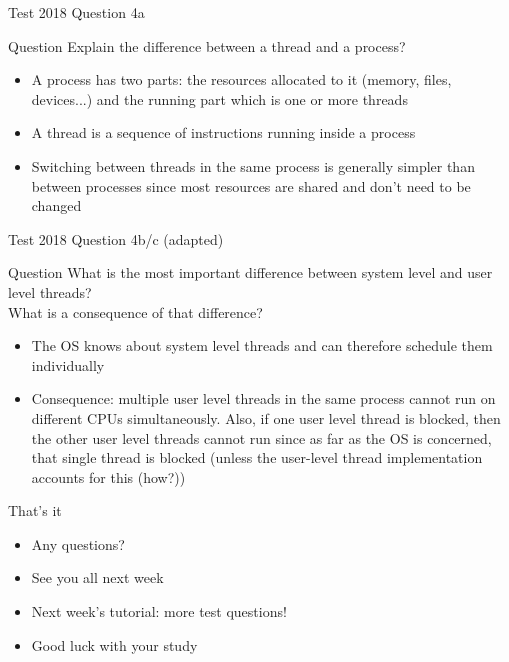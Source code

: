 \documentclass[notes]{beamer}
\begin{document}
\begin{frame}{Test 2018 Question 4a}
    \begin{alertblock}{Question}
        Explain the difference between a thread and a process?
    \end{alertblock}
    \pause
    \begin{itemize}
        \item A process has two parts: the resources allocated to it (memory, files, devices...) and the running part which is one or more threads
        \item A thread is a sequence of instructions running inside a process
        \item Switching between threads in the same process is generally simpler than between processes since most resources are shared and don't need to be changed
    \end{itemize}
\end{frame}
\begin{frame}{Test 2018 Question 4b/c (adapted)}
    \begin{alertblock}{Question}
        What is the most important difference between system level and user level threads? \\
        What is a consequence of that difference?
    \end{alertblock}
    \pause
    \begin{itemize}
        \item The OS knows about system level threads and can therefore schedule them individually
        \pause
        \item Consequence: multiple user level threads in the same process cannot run on different CPUs simultaneously. Also, if one user level thread is blocked, then the other user level threads cannot run since as far as the OS is concerned, that single thread is blocked (unless the user-level thread implementation accounts for this (how?))
    \end{itemize}
\end{frame}

\begin{frame}{That's it}
    \begin{itemize}
        \item Any questions?
        \item See you all next week
        \item Next week's tutorial: more test questions!
        \item Good luck with your study
    \end{itemize}
\end{frame}
\end{document}
